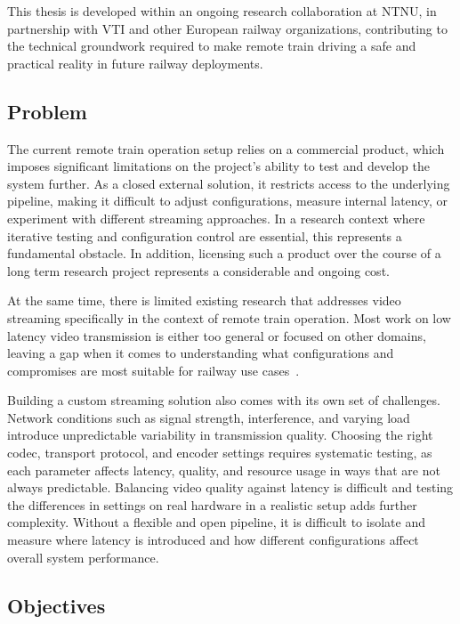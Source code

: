 This thesis is developed within an ongoing research collaboration at NTNU, in partnership with VTI and other European railway organizations, contributing to the technical groundwork required to make remote train driving a safe and practical reality in future railway deployments.

\subsection{Problem}

The current remote train operation setup relies on a commercial product, which imposes significant limitations on the project's ability to test and develop the system further. As a closed external solution, it restricts access to the underlying pipeline, making it difficult to adjust configurations, measure internal latency, or experiment with different streaming approaches. In a research context where iterative testing and configuration control are essential, this represents a fundamental obstacle. In addition, licensing such a product over the course of a long term research project represents a considerable and ongoing cost.

At the same time, there is limited existing research that addresses video streaming specifically in the context of remote train operation. Most work on low latency video transmission is either too general or focused on other domains, leaving a gap when it comes to understanding what configurations and compromises are most suitable for railway use cases~\cite{myhrvold2025}.

Building a custom streaming solution also comes with its own set of challenges. Network conditions such as signal strength, interference, and varying load introduce unpredictable variability in transmission quality. Choosing the right codec, transport protocol, and encoder settings requires systematic testing, as each parameter affects latency, quality, and resource usage in ways that are not always predictable. Balancing video quality against latency is difficult and testing the differences in settings on real hardware in a realistic setup adds further complexity. Without a flexible and open pipeline, it is difficult to isolate and measure where latency is introduced and how different configurations affect overall system performance.

\subsection{Objectives}

